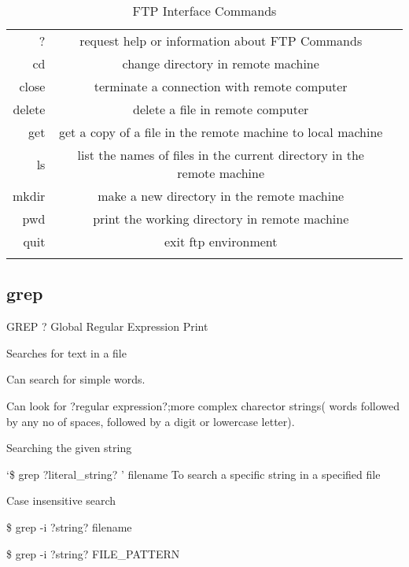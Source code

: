 \documentclass{article}
\begin{document}
\begin{table}[htb]
\caption {FTP Interface Commands}
\label {Common Commands}
\begin{tabular}{rcc}
\noalign{\smallskip}\hline\hline\noalign{\smallskip}
? & request help or information about FTP Commands\\
cd & change directory in remote machine\\
close & terminate a connection with remote computer\\
delete & delete a file in remote computer\\
get & get a copy of a file in the remote machine to local machine\\
ls & list the names of files in the current directory in the remote machine\\
mkdir & make a new directory in the remote machine\\
pwd & print the working directory in remote machine\\
quit & exit ftp environment\\
\noalign{\smallskip}\hline\hline\noalign{\smallskip}

\end{tabular}
\end{table}

\subsection{grep}

GREP ? Global Regular Expression Print

 	\hspace{10mm}Searches for text in a file
	
 	\hspace{10mm}Can search for simple words.
	
 	\hspace{10mm}Can look for ?regular expression?;more complex charector strings( words followed by any no of spaces, followed by a digit or lowercase letter).


	Searching the given string

		     \hspace{10mm}`\$ grep ?literal\_string? ' filename To search a specific string in a specified file


	Case insensitive search
	
			        \hspace{10mm}\$ grep -i ?string? filename
			        
       				\hspace{10mm}\$ grep -i ?string? FILE\_PATTERN\*
				
\end{document}
